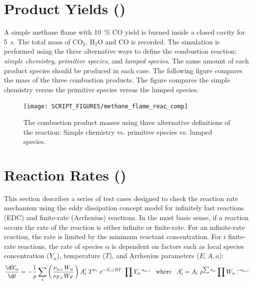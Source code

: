 \documentclass[11pt]{book}
\begin{document}
\section{Product Yields (\texorpdfstring{}{methane\_flame})}
\label{methane_flame}

A simple methane flame with 10~\% CO yield is burned inside a closed cavity for 5~s.
The total mass of CO$_2$, H$_2$O and CO is recorded.
The simulation is performed using the three alternative ways
to define the combustion reaction: {\em simple chemistry}, {\em primitive species}, and {\em lumped species}. The
same amount of each product species should be produced in each case. The following figure compares the
mass of the three combustion products. The figure compares the simple chemistry versus the primitive species versus the lumped species.
\begin{figure}[ht]
\centering
\texttt{[image: SCRIPT\_FIGURES/methane\_flame\_reac\_comp]}
\caption[Yield of combustion products for alternative reactions]{The combustion product masses using three alternative definitions of the reaction:  Simple chemistry vs. primitive species vs. lumped species. }
\label{fig_methane_flame_yields}
\end{figure}

\clearpage

\section{Reaction Rates (\texorpdfstring{}{reactionrate})}

This section describes a series of test cases designed to check the reaction rate mechanism using the eddy dissipation concept model for infinitely fast reactions (EDC) and  finite-rate (Arrhenius) reactions. In the most basic sense, if a reaction occurs the rate of the reaction is either infinite or finite-rate. For an infinite-rate reaction, the rate is limited by the minimum reactant concentration. For $i$ finite-rate reactions, the rate of species $\alpha$ is dependent on factors such as local species concentration ($Y_{\alpha}$), temperature ($T$), and Arrhenius parameters ($E,A,a$):
\begin{equation}\label{eq:finite_rate1}
\frac{\d Y_{\alpha}}{\d t} = -\frac{1}{\rho}\sum_{i} \left(\frac{\nu_{\alpha,i}\,W_{\alpha}}{\nu_{F,i}\,W_{F}}\right)A_i^{\prime}\;T^{n_i}\;e^{-E_i/RT}\;\prod Y_{\alpha}\,^{a_{\alpha,i}} \;\;\; \text{where} \;\;\; A^{\prime}_{i} = A_{i}\;\rho^{\sum a_{\alpha}}\prod W_{\alpha}\,^{-a_{\alpha,i}}
\end{equation}
\end{document}
